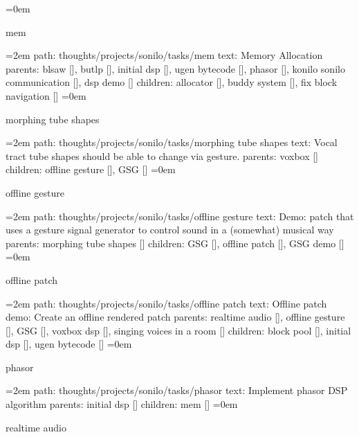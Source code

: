 \smallskip
\leftskip=0em
\par\endgroup
\bigskip
{}
mem
\smallskip
\par\begingroup
\leftskip=2em
path: thoughts/projects/sonilo/tasks/mem
\smallskip
text:  Memory Allocation
\smallskip
parents:  blsaw [], butlp [], initial dsp [], ugen bytecode [], phasor [], konilo sonilo communication [], dsp demo []
\smallskip
children: allocator [], buddy system [], fix block navigation []
\smallskip
\leftskip=0em
\par\endgroup
\bigskip
{}
morphing tube shapes
\smallskip
\par\begingroup
\leftskip=2em
path: thoughts/projects/sonilo/tasks/morphing tube shapes
\smallskip
text:  Vocal tract tube shapes should be able to change via gesture.
\smallskip
parents:  voxbox []
\smallskip
children: offline gesture [], GSG []
\smallskip
\leftskip=0em
\par\endgroup
\bigskip
{}
offline gesture
\smallskip
\par\begingroup
\leftskip=2em
path: thoughts/projects/sonilo/tasks/offline gesture
\smallskip
text:  Demo: patch that uses a gesture signal generator to control sound in a (somewhat) musical way
\smallskip
parents:  morphing tube shapes []
\smallskip
children: GSG [], offline patch [], GSG demo []
\smallskip
\leftskip=0em
\par\endgroup
\bigskip
{}
offline patch
\smallskip
\par\begingroup
\leftskip=2em
path: thoughts/projects/sonilo/tasks/offline patch
\smallskip
text:  Offline patch demo: Create an offline rendered patch
\smallskip
parents:  realtime audio [], offline gesture [], GSG [], voxbox dsp [], singing voices in a room []
\smallskip
children: block pool [], initial dsp [], ugen bytecode []
\smallskip
\leftskip=0em
\par\endgroup
\bigskip
{}
phasor
\smallskip
\par\begingroup
\leftskip=2em
path: thoughts/projects/sonilo/tasks/phasor
\smallskip
text:  Implement phasor DSP algorithm
\smallskip
parents:  initial dsp []
\smallskip
children: mem []
\smallskip
\leftskip=0em
\par\endgroup
\bigskip
{}
realtime audio
\smallskip
